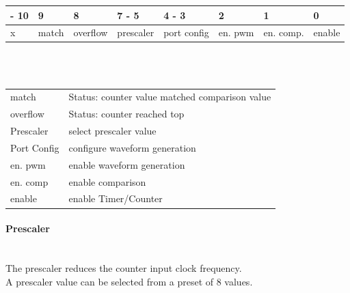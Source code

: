 \begin{tabular}{|P{18mm}|P{14mm}|P{15mm}|P{18mm}|P{20mm}|P{15mm}|P{18mm}|P{14mm}|}
     - 10 & 9 & 8 & 7 - 5 & 4 - 3 & 2 & 1 & 0 \\
    \hline
    x & match & overflow & prescaler & port config & en. pwm & en. comp. & enable\\
    \hline
\end{tabular}\\ ~\\

\begin{tabular}{@{}p{22mm}|p{100mm}}
    match & Status: counter value matched comparison value\\
    overflow & Status: counter reached top\\ 
    Prescaler & select prescaler value \\
    Port Config & configure waveform generation \\
    en. pwm & enable waveform generation \\
    en. comp & enable comparison \\
    enable & enable Timer/Counter 
\end{tabular}

\paragraph{Prescaler}~\\
The prescaler reduces the counter input clock frequency.\\ A prescaler value can be selected from a preset of 8 values.\\

